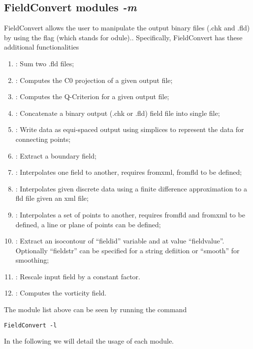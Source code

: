 \subsection{FieldConvert modules \textit{-m}}
FieldConvert allows the user to manipulate the \nekpp output 
binary files (.chk and .fld) by using the flag  (which 
stands for odule).. 
Specifically, FieldConvert has these additional functionalities
%
\begin{enumerate}
\item {}: Sum two .fld files;
\item {}: Computes the C0 projection of a given output file;
\item {}: Computes the Q-Criterion for a given output file;
\item {}: Concatenate a \nekpp binary output (.chk or .fld) field file into single file;
\item {}: Write data as equi-spaced output using simplices to represent the data for connecting points;
\item {}: Extract a boundary field;
\item {}: Interpolates one field to another, requires fromxml, fromfld to be defined;
\item {}: Interpolates given discrete data using a finite difference approximation to a fld file given an xml file;
\item {}: Interpolates a set of points to another, requires fromfld and fromxml to be defined, a line or plane of points can be defined;
\item {}: Extract an isocontour of ``fieldid'' variable and at value ``fieldvalue''. Optionally ``fieldstr'' can be specified for a string defiition or ``smooth'' for smoothing; 
\item {}: Rescale input field by a constant factor.
\item {}: Computes the vorticity field.
\end{enumerate}
The module list above can be seen by running the command
%
\begin{lstlisting}[style=BashInputStyle]
FieldConvert -l 
\end{lstlisting}
%
In the following we will detail the usage of each module.
%
%
%

